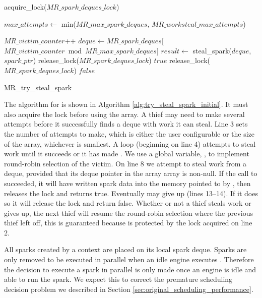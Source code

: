 \begin{algorithm}
\begin{algorithmic}[1]
  \State acquire\_lock($MR\_spark\_deques\_lock$)

  \State $max\_attempts \gets$ min($MR\_max\_spark\_deques$,
    $MR\_worksteal\_max\_attempts$)

    \State $MR\_victim\_counter$++
    \State $deque \gets
       MR\_spark\_deques$[$MR\_victim\_counter \bmod MR\_max\_spark\_deques$]
      \State $result \gets$ steal\_spark($deque$, $spark\_ptr$)
        \State release\_lock($MR\_spark\_deques\_lock$)
        \State \Return $true$
      \EndIf
    \EndIf
  \EndFor
  \State release\_lock($MR\_spark\_deques\_lock$)
  \State \Return $false$
\EndProcedure
\end{algorithmic}
\caption{MR\_try\_steal\_spark}
\label{alg:try_steal_spark_initial}
\end{algorithm}

The algorithm for \trystealspark is shown in
Algorithm \ref{alg:try_steal_spark_initial}.
It must also acquire the lock before using the array.
A thief may need to make several attempts before it successfully finds a
deque with work it can steal.
Line 3 sets the number of attempts to make, which is either the user
configurable  or the size of the array,
whichever is smallest.
A loop (beginning on line 4) attempts to steal work until it succeeds or it
has made .
We use a global variable, ,
to implement round-robin selection of the victim.
On line 8 we attempt to steal work from a deque,
provided that its deque pointer in the array array is non-null.
If the call to \steal succeeded,
it will have written spark data into the memory pointed to by
,
then \trystealspark releases the lock and returns true.
Eventually \trystealspark may give up (lines 13--14).
If it does so it will release the lock and return false.
Whether or not a thief steals work or gives up,
the next thief will resume the round-robin selection where the previous
thief left off,
this is guaranteed because  is protected by the
lock acquired on line 2.

All sparks created by a context are placed on its local spark deque.
Sparks are only removed to be executed in parallel when an idle engine
executes \trystealspark.
Therefore
the decision to execute a spark in parallel is only made once an engine is
idle and able to run the spark.
We expect this to correct the premature scheduling decision problem we
described in Section \ref{sec:original_scheduling_performance}.

